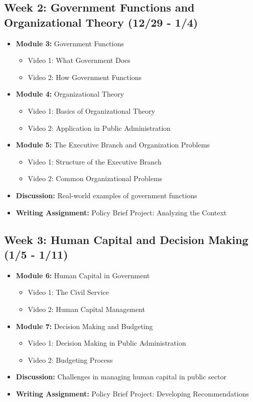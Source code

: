 \documentclass[11pt, letterpaper]{article}
\begin{document}
\subsection*{Week 2: Government Functions and Organizational Theory (12/29 - 1/4)}
\begin{itemize}
    \item \textbf{Module 3:} Government Functions
        \begin{itemize}
            \item Video 1: What Government Does
            \item Video 2: How Government Functions
        \end{itemize}
    \item \textbf{Module 4:} Organizational Theory
        \begin{itemize}
            \item Video 1: Basics of Organizational Theory
            \item Video 2: Application in Public Administration
        \end{itemize}
    \item \textbf{Module 5:} The Executive Branch and Organization Problems
    \begin{itemize}
        \item Video 1: Structure of the Executive Branch
        \item Video 2: Common Organizational Problems
    \end{itemize} 
    \item \textbf{Discussion:} Real-world examples of government functions
    \item \textbf{Writing Assignment:} Policy Brief Project: Analyzing the Context
\end{itemize}

\subsection*{Week 3: Human Capital and Decision Making (1/5 - 1/11)}
\begin{itemize}
    \item \textbf{Module 6:} Human Capital in Government
        \begin{itemize}
            \item Video 1: The Civil Service
            \item Video 2: Human Capital Management
        \end{itemize}
    \item \textbf{Module 7:} Decision Making and Budgeting
        \begin{itemize}
            \item Video 1: Decision Making in Public Administration
            \item Video 2: Budgeting Process
        \end{itemize}
    \item \textbf{Discussion:} Challenges in managing human capital in public sector
    \item \textbf{Writing Assignment:} Policy Brief Project: Developing Recommendations
\end{itemize}
\end{document}
